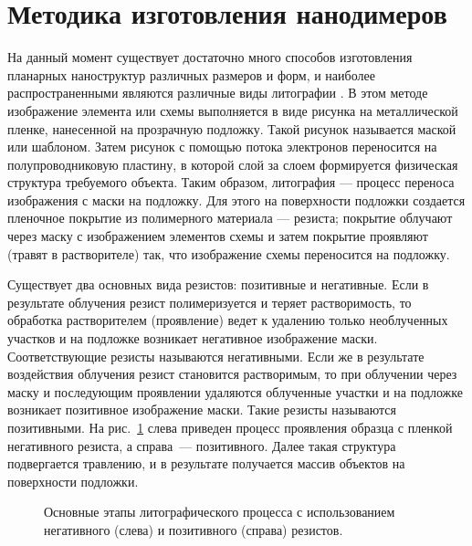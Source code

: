 \section{Методика изготовления нанодимеров}

На данный момент существует достаточно много способов изготовления планарных наноструктур различных размеров и форм, и наиболее распространенными являются различные виды литографии \cite{nanotechnologybook}. В этом методе изображение элемента или схемы выполняется в виде рисунка на металлической пленке, нанесенной на прозрачную подложку. Такой рисунок называется маской или шаблоном. Затем рисунок с помощью потока электронов переносится на полупроводниковую пластину, в которой слой за слоем формируется физическая структура требуемого объекта. Таким образом, литография --- процесс переноса изображения с маски на подложку. Для этого на поверхности подложки создается пленочное покрытие из полимерного материала --- резиста; покрытие облучают через маску с изображением элементов схемы и затем покрытие проявляют (травят в растворителе) так, что изображение схемы переносится на подложку.

Существует два основных вида резистов: позитивные и негативные. Если в результате облучения резист полимеризуется и теряет растворимость, то обработка растворителем (проявление) ведет к удалению только необлученных участков и на подложке возникает негативное изображение маски. Соответствующие резисты называются негативными. Если же в результате воздействия облучения резист становится растворимым, то при облучении через маску и последующим проявлении удаляются облученные участки и на подложке возникает позитивное изображение маски. Такие резисты называются позитивными. На рис.~\ref{img:litography} слева приведен процесс проявления образца с пленкой негативного резиста, а справа~--- позитивного. Далее такая структура подвергается травлению, и в результате получается массив объектов на поверхности подложки.

\begin{figure}
\caption{Основные этапы литографического процесса с использованием негативного (слева) и позитивного (справа) резистов.}
\label{img:litography}
\end{figure}

